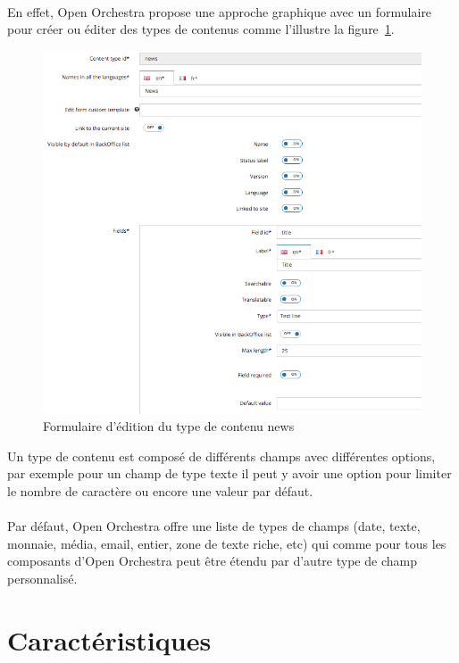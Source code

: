           \paragraph{}
          En effet, Open Orchestra propose une approche graphique avec un formulaire pour créer ou éditer des types de contenus comme l'illustre la figure~\ref{content_type}.
             		\begin{figure}[H]
          \includegraphics[scale=0.6]{images/content_type}
        \caption{Formulaire d'édition du type de contenu news}
        \label{content_type}
      \end{figure}
          Un type de contenu est composé de différents champs avec différentes options, par exemple pour un champ de type texte il peut y avoir une option pour limiter le nombre de caractère ou encore une valeur par défaut.
          \paragraph{}
          Par défaut, Open Orchestra offre une liste de types de champs (date, texte, monnaie, média, email, entier, zone de texte riche, etc) qui comme pour tous les composants d'Open Orchestra peut être étendu par d'autre type de champ personnalisé. 
\section{Caractéristiques}
